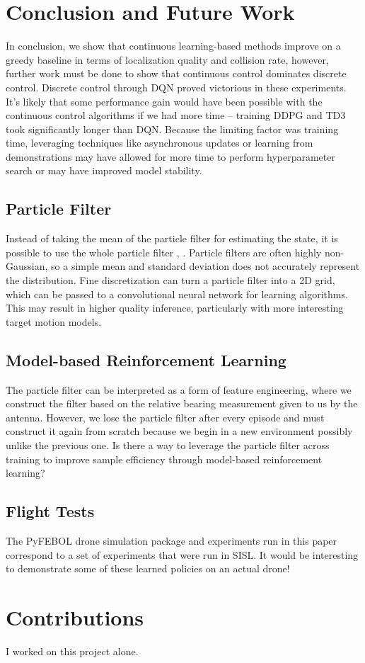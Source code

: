 \documentclass[10pt,twocolumn,letterpaper]{article}
\begin{document}
\section{Conclusion and Future Work}
In conclusion, we show that continuous learning-based methods improve on a greedy baseline in terms of localization quality and collision rate, however, further work must be done to show that continuous control dominates discrete control.
Discrete control through DQN proved victorious in these experiments.
It's likely that some performance gain would have been possible with the continuous control algorithms if we had more time -- training DDPG and TD3 took significantly longer than DQN.
Because the limiting factor was training time, leveraging techniques like asynchronous updates \cite{a3c} or learning from demonstrations \cite{dqfd} may have allowed for more time to perform hyperparameter search or may have improved model stability.

\subsection{Particle Filter}
Instead of taking the mean of the particle filter for estimating the state, it is possible to use the whole particle filter \cite{dronehunter}, \cite{kyle1}.
Particle filters are often highly non-Gaussian, so a simple mean and standard deviation does not accurately represent the distribution.
Fine discretization can turn a particle filter into a 2D grid, which can be passed to a convolutional neural network for learning algorithms.
This may result in higher quality inference, particularly with more interesting target motion models.

\subsection{Model-based Reinforcement Learning}
The particle filter can be interpreted as a form of feature engineering, where we construct the filter based on the relative bearing measurement given to us by the antenna.
However, we lose the particle filter after every episode and must construct it again from scratch because we begin in a new environment possibly unlike the previous one.
Is there a way to leverage the particle filter across training to improve sample efficiency through model-based reinforcement learning?

\subsection{Flight Tests}
The PyFEBOL drone simulation package and experiments run in this paper correspond to a set of experiments that were run in SISL.
It would be interesting to demonstrate some of these learned policies on an actual drone!


\section{Contributions}
I worked on this project alone.

{\small


}
\end{document}
